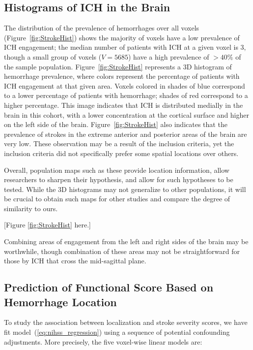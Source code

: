 \documentclass[10pt]{article}\usepackage[]{graphicx}\usepackage[]{color}
\begin{document}
\subsection{Histograms of ICH in the Brain}



The distribution of the prevalence of hemorrhages over all voxels (Figure~\ref{fig:StrokeHist}\protect{}) shows the majority of voxels have a low prevalence of ICH engagement; the median number of patients with ICH at a given voxel is 3, though a small group of voxels ($V = 5685$) have a high prevalence of $> 40\%$ of the sample population.  Figure~\ref{fig:StrokeHist}\protect{} represents a 3D histogram of hemorrhage prevalence, where colors represent the percentage of patients with ICH engagement at that given area.  Voxels colored in shades of blue correspond to a lower percentage of patients with hemorrhage; shades of red correspond to a higher percentage.  This image indicates that ICH is
distributed medially in the brain in this cohort, with a lower concentration
at the cortical surface and higher on the left side of the brain.  Figure~\ref{fig:StrokeHist}\protect{} also indicates that the prevalence of strokes in the extreme anterior and posterior areas of the brain are very low.  
These observation may be a result of the inclusion criteria, yet the inclusion criteria \citep{mould_minimally_2013} did not specifically prefer some spatial locations over others. 

Overall, population maps such as these provide location information, allow researchers to sharpen their hypothesis, and allow for such hypotheses to be tested. While the 3D histograms may not generalize to other populations, it will be crucial to obtain such maps for other studies and compare the degree of similarity to ours.  

[Figure \ref{fig:StrokeHist} here.]


Combining areas of engagement from the left and right sides of the brain may be worthwhile, though combination of these areas may not be straightforward for those by ICH that cross the mid-sagittal plane.  




\subsection{Prediction of Functional Score Based on Hemorrhage Location}

To study the association between localization and stroke severity scores, we have fit model~(\ref{eq:nihss_regression}) using a sequence of  potential confounding adjustments. More precisely, the five voxel-wise linear models are:
\end{document}
